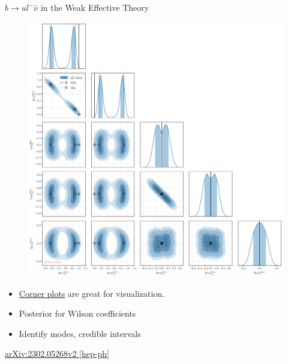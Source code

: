 \documentclass[
aspectratio=169,
14pt,
professionalfonts
]{beamer}
\begin{document}
\begin{frame}{$b\to u l^- \bar \nu$ in the Weak Effective Theory}
    \vspace{-0.5cm}
    \begin{minipage}{0.5\textwidth}
        \begin{figure}
            \includegraphics[width=\textwidth]{../plots/wet-posterior.png}
        \end{figure}
    \end{minipage}
    \begin{minipage}{0.49\textwidth}
        \begin{itemize}
            \item \href{https://corner.readthedocs.io/en/latest/}{Corner plots} are great for visualization.
            \item Posterior for Wilson coefficients
            \item Identify modes, credible intervals
        \end{itemize}
        \vspace{0.5cm}
        \begin{flushright}
            \small
            \href{https://arxiv.org/pdf/2302.05268}{arXiv:2302.05268v2 [hep-ph]}
        \end{flushright}
    \end{minipage}
\end{frame}
\end{document}
